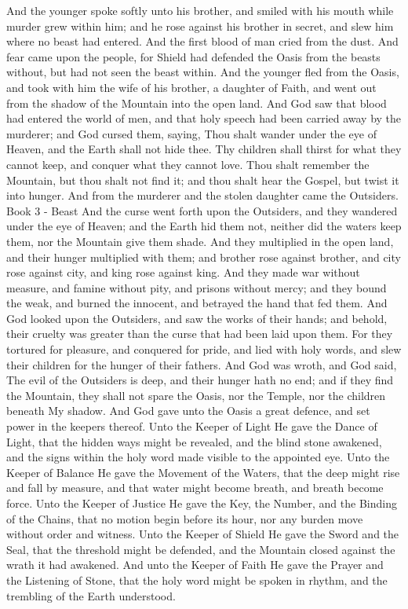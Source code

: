 And the younger spoke softly unto his brother, and smiled with his mouth while murder grew within him; and he rose against his brother in secret, and slew him where no beast had entered. And the first blood of man cried from the dust. And fear came upon the people, for Shield had defended the Oasis from the beasts without, but had not seen the beast within. And the younger fled from the Oasis, and took with him the wife of his brother, a daughter of Faith, and went out from the shadow of the Mountain into the open land.
And God saw that blood had entered the world of men, and that holy speech had been carried away by the murderer; and God cursed them, saying, Thou shalt wander under the eye of Heaven, and the Earth shall not hide thee. Thy children shall thirst for what they cannot keep, and conquer what they cannot love. Thou shalt remember the Mountain, but thou shalt not find it; and thou shalt hear the Gospel, but twist it into hunger. And from the murderer and the stolen daughter came the Outsiders.
Book 3 - Beast
And the curse went forth upon the Outsiders, and they wandered under the eye of Heaven; and the Earth hid them not, neither did the waters keep them, nor the Mountain give them shade. And they multiplied in the open land, and their hunger multiplied with them; and brother rose against brother, and city rose against city, and king rose against king. And they made war without measure, and famine without pity, and prisons without mercy; and they bound the weak, and burned the innocent, and betrayed the hand that fed them.
And God looked upon the Outsiders, and saw the works of their hands; and behold, their cruelty was greater than the curse that had been laid upon them. For they tortured for pleasure, and conquered for pride, and lied with holy words, and slew their children for the hunger of their fathers. And God was wroth, and God said, The evil of the Outsiders is deep, and their hunger hath no end; and if they find the Mountain, they shall not spare the Oasis, nor the Temple, nor the children beneath My shadow.
And God gave unto the Oasis a great defence, and set power in the keepers thereof. Unto the Keeper of Light He gave the Dance of Light, that the hidden ways might be revealed, and the blind stone awakened, and the signs within the holy word made visible to the appointed eye. Unto the Keeper of Balance He gave the Movement of the Waters, that the deep might rise and fall by measure, and that water might become breath, and breath become force. Unto the Keeper of Justice He gave the Key, the Number, and the Binding of the Chains, that no motion begin before its hour, nor any burden move without order and witness. Unto the Keeper of Shield He gave the Sword and the Seal, that the threshold might be defended, and the Mountain closed against the wrath it had awakened. And unto the Keeper of Faith He gave the Prayer and the Listening of Stone, that the holy word might be spoken in rhythm, and the trembling of the Earth understood.
